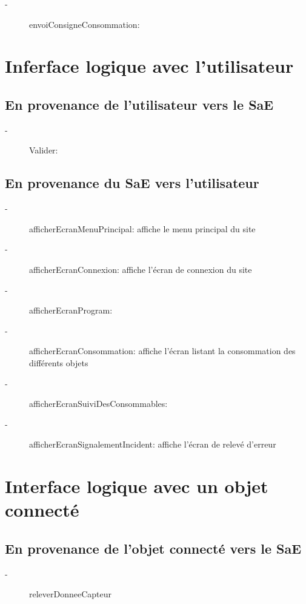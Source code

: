 \documentclass[10pt,a4paper]{report}
\begin{document}
\begin{description}
	\item[-] envoiConsigneConsommation:
\end{description}
			
		\section{Inferface logique avec l'utilisateur}
			\subsection{En provenance de l'utilisateur vers le SaE}
			
\begin{description}
	\item[-] Valider:
\end{description}
			
			\subsection{En provenance du SaE vers l'utilisateur}
			
\begin{description}
	\item[-] afficherEcranMenuPrincipal: affiche le menu principal du site
	\item[-] afficherEcranConnexion: affiche l'écran de connexion du site
	\item[-] afficherEcranProgram:
	\item[-] afficherEcranConsommation: affiche l'écran listant la consommation des différents objets
	\item[-] afficherEcranSuiviDesConsommables: 
	\item[-] afficherEcranSignalementIncident: affiche l'écran de relevé d'erreur
\end{description}
			
		\section{Interface logique avec un objet connecté}
			\subsection{En provenance de l'objet connecté vers le SaE}
			
\begin{description}
	\item[-] releverDonneeCapteur
\end{description}
			
\end{document}
